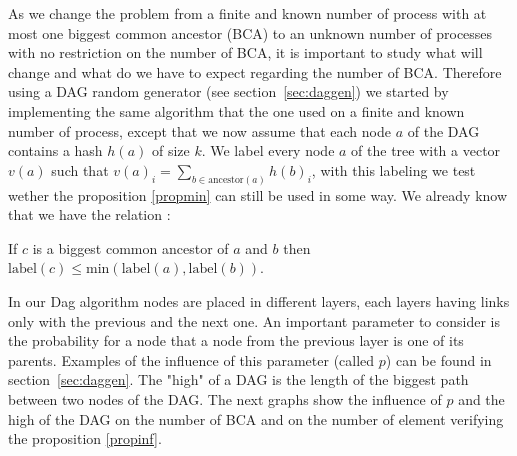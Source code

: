 As we change the problem from a finite and known number of process with at most one biggest common ancestor (BCA) to an unknown number of processes with no restriction on the number of BCA, it is important to study what will change and what do we have to expect regarding the number of BCA. Therefore using a DAG random generator (see section~\ref{sec:daggen}) we started by implementing the same algorithm that the one used on a finite and known number of process, except that we now assume that each node $a$ of the DAG contains a hash $h(a)$ of size $k$. We label every node $a$ of the tree with a vector $v(a)$ such that $v(a)_i=\sum_{b\in \mathrm{ancestor}(a)} h(b)_i$, with this labeling we test wether the proposition \ref{propmin} can still be used in some way. We already know that we have the relation :
\begin{proposition}
 If $c$ is a biggest common ancestor of $a$ and $b$ then $\mathrm{label}(c) \leq \mathrm{min}(\mathrm{label}(a),\mathrm{label}(b))$. \label{propinf}
\end{proposition}
In our Dag algorithm nodes are placed in different layers, each layers having links only with the previous and the next one. An important parameter to consider is the probability for a node that a node from the previous layer is one of its parents. Examples of the influence of this parameter (called $p$) can be found in section~\ref{sec:daggen}. The "high" of a DAG is the length of the biggest path between two nodes of the DAG. The next graphs show the influence of $p$ and the high of the DAG on the number of BCA and on the number of element verifying the proposition \ref{propinf}.
